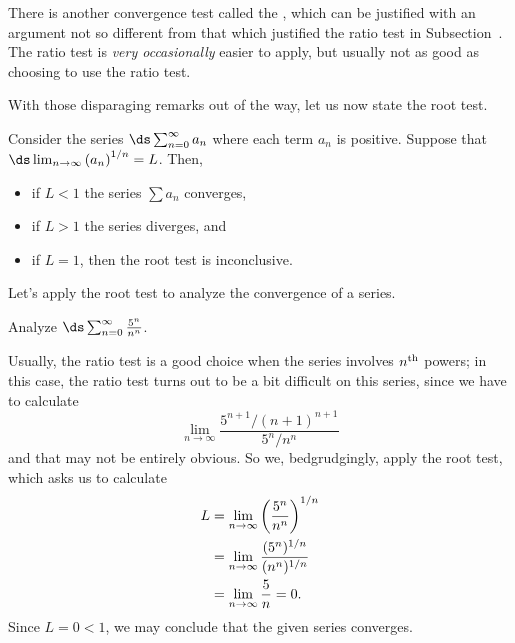 There is another convergence test called the ,
which can be justified with an argument not so
different from that which justified the ratio test in
Subsection~.  The ratio test is
\textit{very occasionally} easier to apply, but usually not as good as
choosing to use the ratio test.

With those disparaging remarks out of the way, let us now state the
root test.

\begin{theorem} \label{thm:root test}
Consider the series $\ds\sum_{n=0}^\infty a_n$ where each term $a_n$ is positive.
Suppose that $\ds\lim_{n\to \infty} \left(a_n\right)^{1/n}=L$.  Then,
\begin{itemize}
\item if $L<1$ the series $\sum a_n$ converges, 
\item if $L>1$ the series diverges, and
\item if $L=1$, then the root test is inconclusive.
\end{itemize}
\end{theorem}

Let's apply the root test to analyze the convergence of a series.

\begin{example} Analyze $\ds\sum_{n=0}^\infty {5^n\over n^n}$.
\end{example}

\begin{solution}
  Usually, the ratio test is a good choice when the series involves
  $n^{\mbox{\scriptsize th}}$ powers; in this case, the ratio test
  turns out to be a bit difficult on this series, since we have to
  calculate
  $$
  \lim_{n \to \infty} \frac{5^{n+1} / (n+1)^{n+1}}{5^n / n^n}
  $$
  and that may not be entirely obvious.  So we, bedgrudgingly, apply
  the root test, which asks us to calculate
\begin{align*}
  L &= \lim_{n\to\infty} \left({5^n\over n^n}\right)^{1/n} \\
  &= \lim_{n\to\infty} {(5^n)^{1/n}\over (n^n)^{1/n}} \\
  &= \lim_{n\to\infty} {5\over n}=0.
\end{align*}
  Since $L = 0<1$, we may conclude that the given series converges.
\end{solution}

